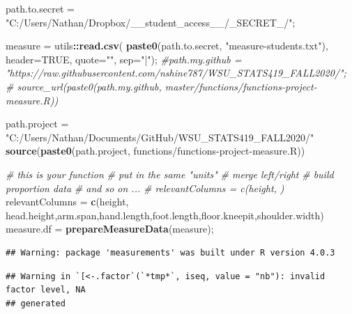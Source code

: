 \documentclass[]{article}
\newenvironment{Shaded}{\begin{snugshade}}{\end{snugshade}}
\newcommand{\CommentTok}[1]{\textcolor[rgb]{0.56,0.35,0.01}{\textit{#1}}}
\newcommand{\DataTypeTok}[1]{\textcolor[rgb]{0.13,0.29,0.53}{#1}}
\newcommand{\KeywordTok}[1]{\textcolor[rgb]{0.13,0.29,0.53}{\textbf{#1}}}
\newcommand{\NormalTok}[1]{#1}
\newcommand{\OperatorTok}[1]{\textcolor[rgb]{0.81,0.36,0.00}{\textbf{#1}}}
\newcommand{\OtherTok}[1]{\textcolor[rgb]{0.56,0.35,0.01}{#1}}
\newcommand{\StringTok}[1]{\textcolor[rgb]{0.31,0.60,0.02}{#1}}
\begin{document}
\begin{Shaded}
\begin{Highlighting}[]
\NormalTok{path.to.secret =}\StringTok{ "C:/Users/Nathan/Dropbox/\_\_student\_access\_\_/\_SECRET\_/"}\NormalTok{;}

\NormalTok{measure =}\StringTok{ }\NormalTok{utils}\OperatorTok{::}\KeywordTok{read.csv}\NormalTok{( }\KeywordTok{paste0}\NormalTok{(path.to.secret, }\StringTok{"measure{-}students.txt"}\NormalTok{), }\DataTypeTok{header=}\OtherTok{TRUE}\NormalTok{, }\DataTypeTok{quote=}\StringTok{""}\NormalTok{, }\DataTypeTok{sep=}\StringTok{"|"}\NormalTok{);}
\CommentTok{\#path.my.github = "https://raw.githubusercontent.com/nshine787/WSU\_STATS419\_FALL2020/";}
\CommentTok{\# source\_url(paste0(path.my.github, \textquotesingle{}master/functions/functions{-}project{-}measure.R\textquotesingle{}))}

\NormalTok{path.project =}\StringTok{ "C:/Users/Nathan/Documents/GitHub/WSU\_STATS419\_FALL2020/"}
\KeywordTok{source}\NormalTok{(}\KeywordTok{paste0}\NormalTok{(path.project, }\StringTok{\textquotesingle{}functions/functions{-}project{-}measure.R\textquotesingle{}}\NormalTok{))}

\CommentTok{\# this is your function}
\CommentTok{\# put in the same "units"}
\CommentTok{\# merge left/right}
\CommentTok{\# build proportion data}
\CommentTok{\# and so on ... }
\CommentTok{\# relevantColumns = c(\textquotesingle{}height\textquotesingle{}, )}
\NormalTok{relevantColumns =}\StringTok{ }\KeywordTok{c}\NormalTok{(}\StringTok{\textquotesingle{}height\textquotesingle{}}\NormalTok{, }\StringTok{\textquotesingle{}head.height\textquotesingle{}}\NormalTok{,}\StringTok{\textquotesingle{}arm.span\textquotesingle{}}\NormalTok{,}\StringTok{\textquotesingle{}hand.length\textquotesingle{}}\NormalTok{,}\StringTok{\textquotesingle{}foot.length\textquotesingle{}}\NormalTok{,}\StringTok{\textquotesingle{}floor.kneepit\textquotesingle{}}\NormalTok{,}\StringTok{\textquotesingle{}shoulder.width\textquotesingle{}}\NormalTok{)}
\NormalTok{measure.df =}\StringTok{ }\KeywordTok{prepareMeasureData}\NormalTok{(measure);}
\end{Highlighting}
\end{Shaded}

\begin{verbatim}
## Warning: package 'measurements' was built under R version 4.0.3
\end{verbatim}

\begin{verbatim}
## Warning in `[<-.factor`(`*tmp*`, iseq, value = "nb"): invalid factor level, NA
## generated
\end{verbatim}
\end{document}
